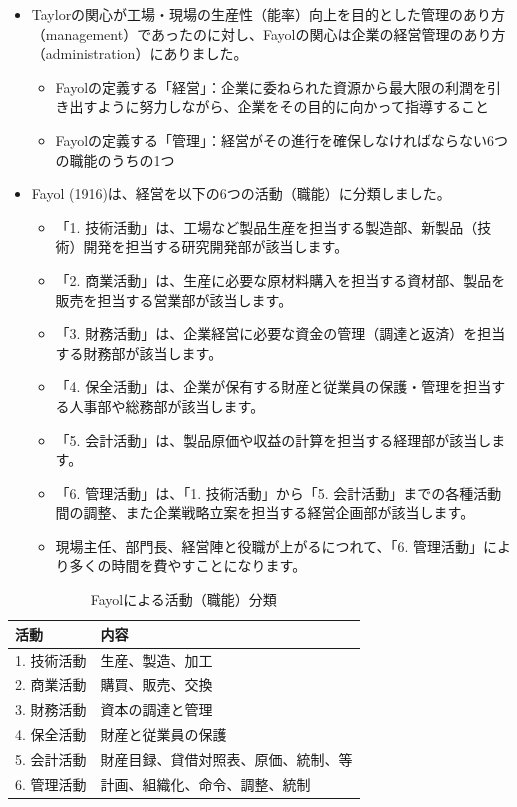 \documentclass[
]{book}
\begin{document}
\begin{itemize}
\item
  Taylorの関心が工場・現場の生産性（能率）向上を目的とした管理のあり方（management）であったのに対し、Fayolの関心は企業の経営管理のあり方（administration）にありました。

  \begin{itemize}
  \item
    Fayolの定義する「経営」：企業に委ねられた資源から最大限の利潤を引き出すように努力しながら、企業をその目的に向かって指導すること
  \item
    Fayolの定義する「管理」：経営がその進行を確保しなければならない6つの職能のうちの1つ
  \end{itemize}
\item
  Fayol (1916)は、経営を以下の6つの活動（職能）に分類しました。

  \begin{itemize}
  \item
    「1. 技術活動」は、工場など製品生産を担当する製造部、新製品（技術）開発を担当する研究開発部が該当します。
  \item
    「2. 商業活動」は、生産に必要な原材料購入を担当する資材部、製品を販売を担当する営業部が該当します。
  \item
    「3. 財務活動」は、企業経営に必要な資金の管理（調達と返済）を担当する財務部が該当します。
  \item
    「4. 保全活動」は、企業が保有する財産と従業員の保護・管理を担当する人事部や総務部が該当します。
  \item
    「5. 会計活動」は、製品原価や収益の計算を担当する経理部が該当します。
  \item
    「6. 管理活動」は、「1. 技術活動」から「5. 会計活動」までの各種活動間の調整、また企業戦略立案を担当する経営企画部が該当します。
  \item
    現場主任、部門長、経営陣と役職が上がるにつれて、「6. 管理活動」により多くの時間を費やすことになります。
  \end{itemize}
\end{itemize}

\begin{table}

\caption{\label{tab:fayola}Fayolによる活動（職能）分類}
\centering
\begin{tabular}[t]{l|l}
\hline
活動 & 内容\\
\hline
1. 技術活動 & 生産、製造、加工\\
\hline
2. 商業活動 & 購買、販売、交換\\
\hline
3. 財務活動 & 資本の調達と管理\\
\hline
4. 保全活動 & 財産と従業員の保護\\
\hline
5. 会計活動 & 財産目録、貸借対照表、原価、統制、等\\
\hline
6. 管理活動 & 計画、組織化、命令、調整、統制\\
\hline
\end{tabular}
\end{table}
\end{document}
